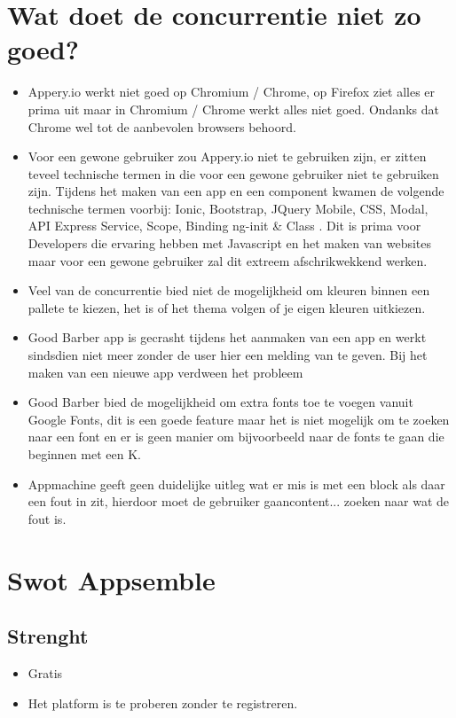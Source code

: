 \section{Wat doet de concurrentie niet zo goed?} 
\begin{itemize}
	\item Appery.io werkt niet goed op Chromium / Chrome, op Firefox ziet alles er prima uit maar in Chromium / Chrome werkt alles niet goed. Ondanks dat Chrome wel tot de aanbevolen browsers behoord.
	
	\item Voor een gewone gebruiker zou Appery.io niet te gebruiken zijn, er zitten teveel technische termen in die voor een gewone gebruiker niet te gebruiken zijn. Tijdens het maken van een app en een component kwamen de volgende technische termen voorbij: Ionic, Bootstrap, JQuery Mobile, CSS, Modal, API Express Service, Scope, Binding ng-init \& Class . Dit is prima voor Developers die ervaring hebben met Javascript en het maken van websites maar voor een gewone gebruiker zal dit extreem afschrikwekkend werken.
	
	\item Veel van de concurrentie bied niet de mogelijkheid om kleuren binnen een pallete te kiezen, het is of het thema volgen of je eigen kleuren uitkiezen.
	
	\item Good Barber app is gecrasht tijdens het aanmaken van een app en werkt sindsdien niet meer zonder de user hier een melding van te geven. Bij het maken van een nieuwe app verdween het probleem
	
	\item Good Barber bied de mogelijkheid om extra fonts toe te voegen vanuit Google Fonts, dit is een goede feature maar het is niet mogelijk om te zoeken naar een font en er is geen manier om bijvoorbeeld naar de fonts te gaan die beginnen met een K.
	
	\item Appmachine geeft geen duidelijke uitleg wat er mis is met een block als daar een fout in zit, hierdoor moet de gebruiker gaancontent... zoeken naar wat de fout is.
\end{itemize}
\section{Swot Appsemble}
\subsection{Strenght}
\begin{itemize}
	\item Gratis
	
	\item Het platform is te proberen zonder te registreren.
\end{itemize}
